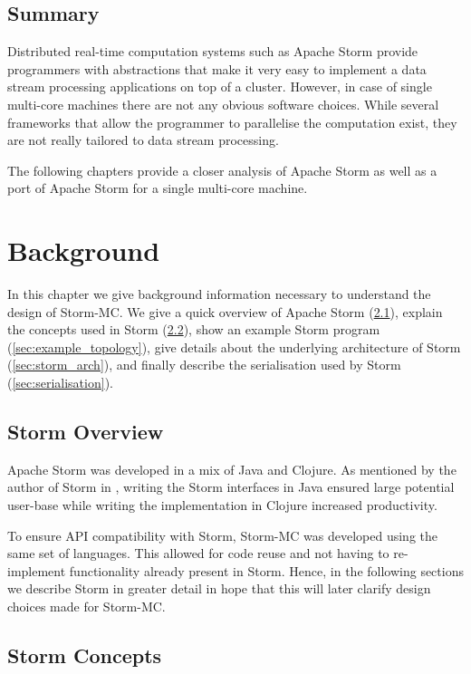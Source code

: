 \documentclass[bsc,logo,frontabs,twoside,singlespacing,normalheadings,parskip]{infthesis}\usepackage[]{graphicx}\usepackage[]{color}
\begin{document}
\section{Summary}

Distributed real-time computation systems such as Apache Storm provide programmers with abstractions that make it very easy to implement a data stream processing applications on top of  a cluster. However, in case of single multi-core machines there are not any obvious software choices. While several frameworks that allow the programmer to parallelise the computation exist, they are not really tailored to data stream processing.

The following chapters provide a closer analysis of Apache Storm as well as a port of Apache Storm for a single multi-core machine.
\clearpage{}

\clearpage{}\chapter{Background}

In this chapter we give background information necessary to understand the design of Storm-MC. We give a quick overview of Apache Storm (\ref{sec:storm_overview}), explain the concepts used in Storm (\ref{sec:concepts}), show an example Storm program (\ref{sec:example_topology}), give details about the underlying architecture of Storm (\ref{sec:storm_arch}), and finally describe the serialisation used by Storm (\ref{sec:serialisation}).

\section{Storm Overview}
\label{sec:storm_overview}

Apache Storm was developed in a mix of Java and Clojure. As mentioned by the author of Storm in \cite{Marz_2014}, writing the Storm interfaces in Java ensured large potential user-base while writing the implementation in Clojure increased productivity.

To ensure API compatibility with Storm, Storm-MC was developed using the same set of languages. This allowed for code reuse and not having to re-implement functionality already present in Storm. Hence, in the following sections we describe Storm in greater detail in hope that this will later clarify design choices made for Storm-MC.

\section{Storm Concepts}
\label{sec:concepts}
\end{document}
